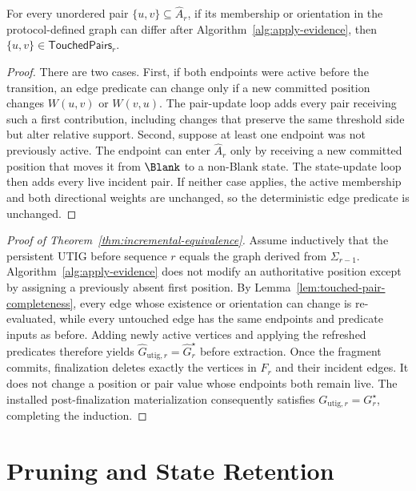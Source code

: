 \begin{lemma}
\label{lem:touched-pair-completeness}
For every unordered pair $\{u,v\}\subseteq\widehat A_r$, if its membership or
orientation in the protocol-defined graph can differ after
Algorithm~\ref{alg:apply-evidence}, then
$\{u,v\}\in\mathsf{TouchedPairs}_r$.
\end{lemma}

\begin{proof}
There are two cases.  First, if both endpoints were active before the
transition, an edge predicate can change only if a new committed position
changes $W(u,v)$ or $W(v,u)$.  The pair-update loop adds every pair receiving
such a first contribution, including changes that preserve the same threshold
side but alter relative support.  Second, suppose at least one endpoint was
not previously active.  The endpoint can enter $\widehat A_r$ only by receiving
a new committed position that moves it from $\Blank$ to a non-Blank state.
The state-update loop then adds every live incident pair.  If neither case
applies, the active membership and both directional weights are unchanged, so
the deterministic edge predicate is unchanged.
\end{proof}

\begin{proof}[Proof of Theorem~\ref{thm:incremental-equivalence}]
Assume inductively that the persistent UTIG before sequence $r$ equals the graph
derived from $\Sigma_{r-1}$.  Algorithm~\ref{alg:apply-evidence} does not modify
an authoritative position except by assigning a previously absent first
position.  By Lemma~\ref{lem:touched-pair-completeness}, every edge whose
existence or orientation can change is re-evaluated, while every untouched
edge has the same endpoints and predicate inputs as before.  Adding newly
active vertices and applying the refreshed predicates therefore yields
$\widehat G_{\mathrm{utig},r}=\widehat G_r^\star$ before extraction.  Once the
fragment commits,
finalization deletes exactly the vertices in $F_r$ and their incident edges.
It does not change a position or pair value whose endpoints both remain live.
The installed post-finalization materialization consequently satisfies
$G_{\mathrm{utig},r}=G_r^\star$, completing the induction.
\end{proof}

\section{Pruning and State Retention}
\label{app:pruning-retention}

